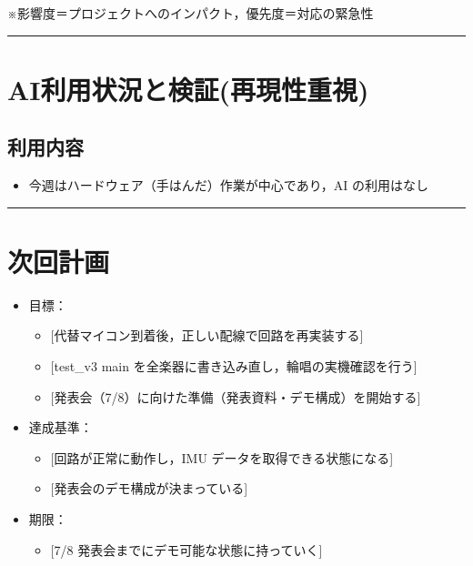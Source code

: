 \documentclass[uplatex,dvipdfmx,a4paper,11pt]{jsarticle}
\newcommand{\sectionrule}{\par\medskip\noindent\rule{\linewidth}{0.6pt}\par\medskip}
\begin{document}
\medskip
※影響度＝プロジェクトへのインパクト，優先度＝対応の緊急性

\sectionrule

\section{AI利用状況と検証(再現性重視)}

\subsection{利用内容}

\begin{itemize}
  \item 今週はハードウェア（手はんだ）作業が中心であり，AI の利用はなし
\end{itemize}

\sectionrule

\section{次回計画}

\begin{itemize}
  \item 目標：
    \begin{itemize}
      \item {}[代替マイコン到着後，正しい配線で回路を再実装する]
      \item {}[test\_v3 main を全楽器に書き込み直し，輪唱の実機確認を行う]
      \item {}[発表会（7/8）に向けた準備（発表資料・デモ構成）を開始する]
    \end{itemize}
  \item 達成基準：
    \begin{itemize}
      \item {}[回路が正常に動作し，IMU データを取得できる状態になる]
      \item {}[発表会のデモ構成が決まっている]
    \end{itemize}
  \item 期限：
    \begin{itemize}
      \item {}[7/8 発表会までにデモ可能な状態に持っていく]
    \end{itemize}
\end{itemize}
\end{document}
